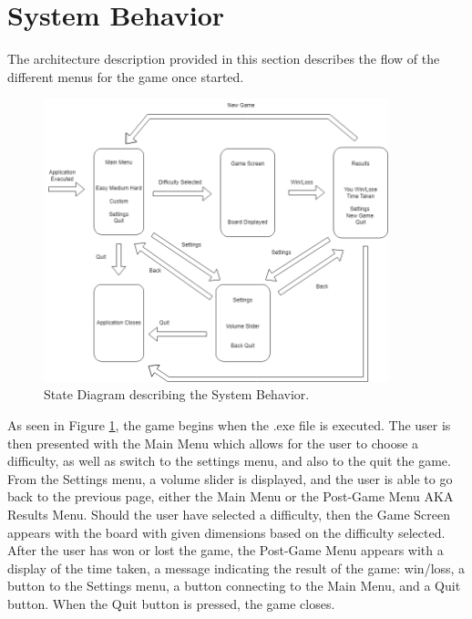 \section{System Behavior}
\label{sec:SysBehavior}

The architecture description provided in this section describes the flow of the different menus for the game once started.

\begin{figure}[h]
    \centering
    \includegraphics[width=10cm]{Images/SysBehavior.png}
       \caption{State Diagram describing the System Behavior.}
           \label{Fig:SysBehavior}
\end{figure}

As seen in Figure \ref{Fig:SysBehavior}, the game begins when the .exe file is executed.
The user is then presented with the Main Menu which allows for the user to choose a difficulty, as well as switch to the settings menu, and also to the quit the game.
From the Settings menu, a volume slider is displayed, and the user is able to go back to the previous page, either the Main Menu or the Post-Game Menu AKA Results Menu.
Should the user have selected a difficulty, then the Game Screen appears with the board with given dimensions based on the difficulty selected.
After the user has won or lost the game, the Post-Game Menu appears with a display of the time taken, a message indicating the result of the game: win/loss, a button to the Settings menu, a button connecting to the Main Menu, and a Quit button.
When the Quit button is pressed, the game closes.